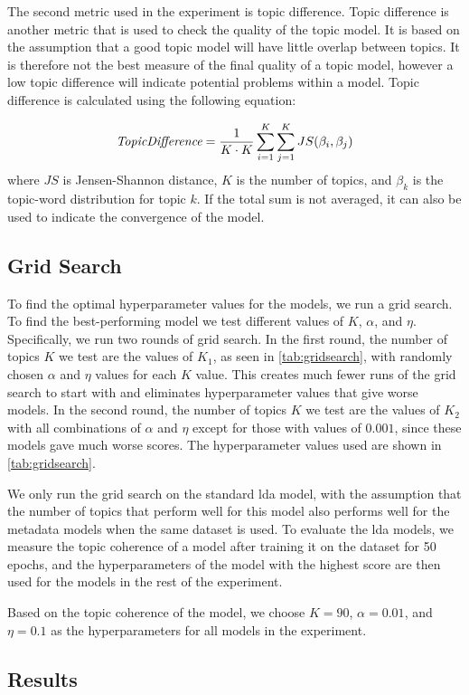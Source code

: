 The second metric used in the experiment is topic difference.
Topic difference is another metric that is used to check the quality of the topic model.
It is based on the assumption that a good topic model will have little overlap between topics.
It is therefore not the best measure of the final quality of a topic model, however a low topic difference will indicate potential problems within a model.
Topic difference is calculated using the following equation:

\begin{equation}
	\emph{TopicDifference} = \frac{1}{K \cdot K} \sum_{i=1}^{K} \sum_{j=1}^{K} JS(\beta_{i},\beta_{j})
\end{equation}
\noindent where $JS$ is Jensen-Shannon distance, $K$ is the number of topics, and $\beta_{k}$ is the topic-word distribution for topic $k$.
If the total sum is not averaged, it can also be used to indicate the convergence of the model.

\subsection{Grid Search}\label{sec:experiment_gridsearch}
To find the optimal hyperparameter values for the models, we run a grid search.
To find the best-performing model we test different values of $K$, $\alpha$, and $\eta$.
Specifically, we run two rounds of grid search.
In the first round, the number of topics $K$ we test are the values of $K_1$, as seen in \autoref{tab:gridsearch}, with randomly chosen $\alpha$ and $\eta$ values for each $K$ value.
This creates much fewer runs of the grid search to start with and eliminates hyperparameter values that give worse models.
In the second round, the number of topics $K$ we test are the values of $K_2$ with all combinations of $\alpha$ and $\eta$ except for those with values of $0.001$, since these models gave much worse scores.
The hyperparameter values used are shown in \autoref{tab:gridsearch}.

We only run the grid search on the standard \gls{lda} model, with the assumption that the number of topics that perform well for this model also performs well for the metadata models when the same dataset is used.
To evaluate the \gls{lda} models, we measure the topic coherence of a model after training it on the dataset for 50 epochs, and the hyperparameters of the model with the highest score are then used for the models in the rest of the experiment.

Based on the topic coherence of the model, we choose $K = 90$, $\alpha = 0.01$, and $\eta = 0.1$ as the hyperparameters for all models in the experiment.



\subsection{Results}\label{sec:results}


